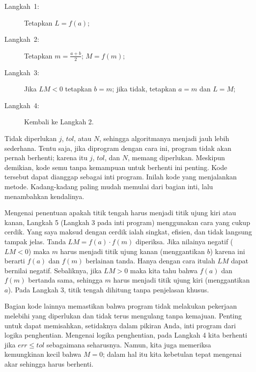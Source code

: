 \begin{pseudocode} 
\begin{description}
\item [{Langkah~1:}] Tetapkan $L=f(a)$;
\item [{Langkah~2:}] Tetapkan $m=\frac{a+b}{2}$; $M=f(m)$; 
\item [{Langkah~3:}] Jika $LM<0$ tetapkan $b=m$; jika tidak, tetapkan
$a=m$ dan $L=M$;
\item [{Langkah~4:}] Kembali ke Langkah 2.
\end{description}
\end{pseudocode}  

\noindent Tidak diperlukan $j$, $tol$, atau $N$, sehingga algoritmanya
menjadi jauh lebih sederhana. Tentu saja, jika diprogram dengan cara
ini, program tidak akan pernah berhenti; karena itu $j$, $tol$,
dan $N$, memang diperlukan. Meskipun demikian, kode semu tanpa kemampuan
untuk berhenti ini penting. Kode tersebut dapat dianggap sebagai inti
program. Inilah kode yang menjalankan metode. Kadang-kadang paling
mudah memulai dari bagian inti, lalu menambahkan kendalinya. 

Mengenai penentuan apakah titik tengah harus menjadi titik ujung kiri
atau kanan, Langkah 5 (Langkah 3 pada inti program) menggunakan cara
yang cukup cerdik. Yang saya maksud dengan cerdik ialah singkat, efisien,
dan tidak langsung tampak jelas. Tanda $LM=f(a)\cdot f(m)$ diperiksa.
Jika nilainya negatif ($LM<0$) maka $m$ harus menjadi titik ujung
kanan (menggantikan $b$) karena ini berarti $f(a)$ dan $f(m)$ berlainan
tanda. Hanya dengan cara itulah $LM$ dapat bernilai negatif. Sebaliknya,
jika $LM>0$ maka kita tahu bahwa $f(a)$ dan $f(m)$ bertanda sama,
sehingga $m$ harus menjadi titik ujung kiri (menggantikan $a$).
Pada Langkah 3, titik tengah dihitung tanpa penjelasan khusus.

Bagian kode lainnya memastikan bahwa program tidak melakukan pekerjaan
melebihi yang diperlukan dan tidak terus mengulang tanpa kemajuan.
Penting untuk dapat memisahkan, setidaknya dalam pikiran Anda, inti
program dari logika penghentian. Mengenai logika penghentian, pada
Langkah 4 kita berhenti jika $err\leq tol$ sebagaimana seharusnya.
Namun, kita juga memeriksa kemungkinan kecil bahwa $M=0$; dalam hal
itu kita kebetulan tepat mengenai akar sehingga harus berhenti.

